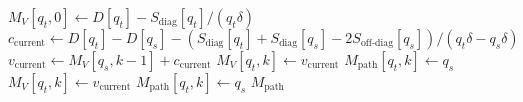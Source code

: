 \documentclass[12pt]{article}
\DeclarePairedDelimiter\floor{\lfloor}{\rfloor}
\begin{document}
\begin{algorithm}
\begin{algorithmic}
        \STATE $M_{V}[q_t, 0] \gets D[q_t] - S_{\text{diag}}[q_t]/(q_t\delta)$ 
        \STATE $c_{\text{current}} \gets D[q_t]-D[q_s] - (S_{\text{diag}}[q_t]+S_{\text{diag}}[q_s]-2S_{\text{off-diag}}[q_s])/(q_t\delta-q_s\delta)$ 
        \STATE $v_{\text{current}} \gets M_V[q_s, k-1] + c_{\text{current}}$ 
        \STATE $M_V[q_t, k] \gets v_{\text{current}}$
        \STATE $M_{\text{path}}[q_t, k] \gets q_s$
        \ELSE
        \STATE $M_V[q_t, k] \gets v_{\text{current}}$
        \STATE $M_{\text{path}}[q_t, k] \gets q_s$
        \ENDIF
        \ENDIF
        \ENDFOR
        \ENDFOR
        \ENDFOR
        \RETURN $M_{\text{path}}$
    \end{algorithmic}
\end{algorithm}
\end{document}
